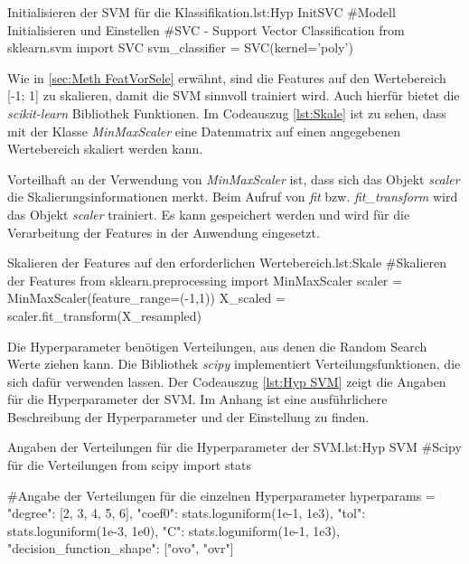 \begin{pythoncode}{Initialisieren der SVM für die Klassifikation.}{lst:Hyp InitSVC}
#Modell Initialisieren und Einstellen
#SVC - Support Vector Classification
from sklearn.svm import SVC
svm_classifier = SVC(kernel='poly')
\end{pythoncode}

Wie in \ref{sec:Meth FeatVorSele} erwähnt, sind die Features auf den Wertebereich [-1; 1] zu skalieren, damit die SVM sinnvoll trainiert wird. Auch hierfür bietet die \textit{scikit-learn} Bibliothek Funktionen. Im Codeauszug \ref{lst:Skale} ist zu sehen, dass mit der Klasse \textit{MinMaxScaler} eine Datenmatrix auf einen angegebenen Wertebereich skaliert werden kann.\par

Vorteilhaft an der Verwendung von \textit{MinMaxScaler} ist, dass sich das Objekt \textit{scaler} die Skalierungsinformationen merkt. Beim Aufruf von \textit{fit} bzw. \textit{fit\_transform} wird das Objekt \textit{scaler} trainiert. Es kann gespeichert werden und wird für die Verarbeitung der Features in der Anwendung eingesetzt. 

\begin{pythoncode}{Skalieren der Features auf den erforderlichen Wertebereich.}{lst:Skale}
#Skalieren der Features 
from sklearn.preprocessing import MinMaxScaler
scaler = MinMaxScaler(feature_range=(-1,1))
X_scaled = scaler.fit_transform(X_resampled)
\end{pythoncode}

Die Hyperparameter benötigen Verteilungen, aus denen die Random Search Werte ziehen kann. Die Bibliothek \textit{scipy} implementiert Verteilungsfunktionen, die sich dafür verwenden lassen. Der Codeauszug \ref{lst:Hyp SVM} zeigt die Angaben für die Hyperparameter der SVM. Im Anhang ist eine ausführlichere Beschreibung der Hyperparameter und der Einstellung zu finden.

\begin{pythoncode}{Angaben der Verteilungen für die Hyperparameter der SVM.}{lst:Hyp SVM}
#Scipy für die Verteilungen
from scipy import stats

#Angabe der Verteilungen für die einzelnen Hyperparameter
hyperparams =  {"degree": [2, 3, 4, 5, 6],
                "coef0": stats.loguniform(1e-1, 1e3),
                "tol": stats.loguniform(1e-3, 1e0),
                "C": stats.loguniform(1e-1, 1e3),
                "decision_function_shape": ["ovo", "ovr"]}
\end{pythoncode}

